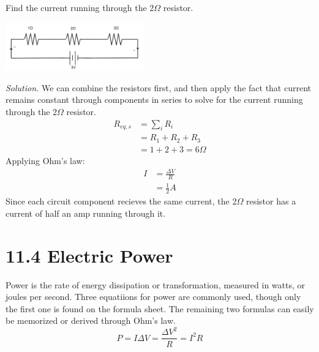 \documentclass[12pt, titlepage]{article}
\begin{document}
 \begin{Problem}
    Find the current running through the 2$\Omega$ resistor.
    \begin{center}
        \includegraphics*[width=6cm]{media/circuit1.png}
    \end{center}
    \tcblower

    \textit{Solution. }We can combine the resistors first, and then apply the fact that current remains constant through components in series to solve for the current running through the 2$\Omega$ resistor.
    \begin{align*}
        R_{eq,s} &= \sum_{i}R_{i} \\
        &= R_1+R_2+R_3 \\
        &= 1 + 2 + 3 = 6\Omega
     \end{align*}
     Applying Ohm's law: 
     \begin{align*}
        I &= \frac{\Delta V}{R} \\
        &= \frac{1}{2}A
     \end{align*}
     Since each circuit component recieves the same current, the 2$\Omega$ resistor has a current of half an amp running through it.
 \end{Problem}
\section*{11.4 Electric Power}

Power is the rate of energy dissipation or transformation, measured in watts, or joules per second. Three equatiions for power are commonly used, though only the first one is found on the formula sheet. The remaining two formulas can easily be memorized or derived through Ohm's law.
\begin{equation*}
    P = \boxed{I \Delta V} = \frac{\Delta V^2}{R} = I^2R
\end{equation*}
\end{document}
